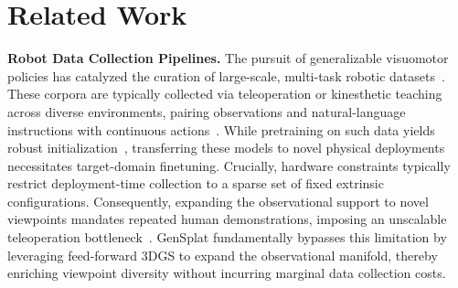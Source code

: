 \section{Related Work}
\label{sec:related}
\noindent \textbf{Robot Data Collection Pipelines.} 
The pursuit of generalizable visuomotor policies has catalyzed the curation of large-scale, multi-task robotic datasets~\cite{o2024open,khazatsky2024droid,walke2023bridgedata,dasari2019robonet}. These corpora are typically collected via teleoperation or kinesthetic teaching across diverse environments, pairing observations and natural-language instructions with continuous actions~\cite{iyer2024open,zhang2025kinedex}. While pretraining on such data yields robust initialization~\cite{qu2025spatialvla,zhao2025cot,kim2024openvla,zheng2024tracevla,black2410pi0}, transferring these models to novel physical deployments necessitates target-domain finetuning. Crucially, hardware constraints typically restrict deployment-time collection to a sparse set of fixed extrinsic configurations. Consequently, expanding the observational support to novel viewpoints mandates repeated human demonstrations, imposing an unscalable teleoperation bottleneck~\cite{iyer2024open,patil2024radiance,zhang2025kinedex}. GenSplat fundamentally bypasses this limitation by leveraging feed-forward 3DGS to expand the observational manifold, thereby enriching viewpoint diversity without incurring marginal data collection costs.


